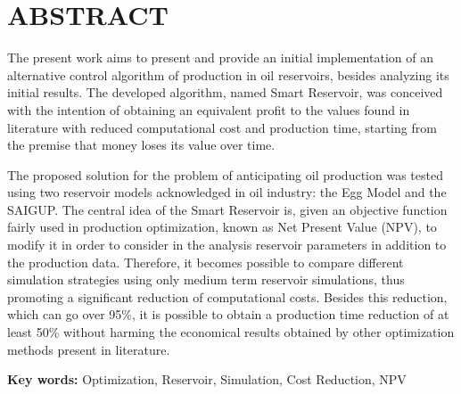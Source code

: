 \chapter[ABSTRACT]{ABSTRACT}
{
The present work aims to present and provide an initial implementation of an alternative control algorithm of production in oil reservoirs, besides analyzing its initial results. The developed algorithm, named Smart Reservoir, was conceived with the intention of obtaining an equivalent profit to the values found in literature with reduced computational cost and production time, starting from the premise that money loses its value over time.

The proposed solution for the problem of anticipating oil production was tested using two reservoir models acknowledged in oil industry: the Egg Model and the SAIGUP. The central idea of the Smart Reservoir is, given an objective function fairly used in production optimization, known as Net Present Value (NPV), to modify it in order to consider in the analysis reservoir parameters in addition to the production data. Therefore, it becomes possible to compare different simulation strategies using only medium term reservoir simulations, thus promoting a significant reduction of computational costs. Besides this reduction, which can go over 95\%, it is possible to obtain a production time reduction of at least 50\% without harming the economical results obtained by other optimization methods present in literature.
 
\textbf{Key words:} Optimization, Reservoir, Simulation, Cost Reduction, NPV
}